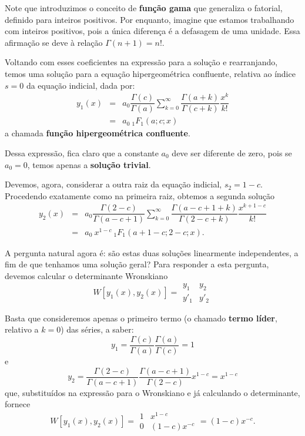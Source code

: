 {Note que introduzimos o conceito de \textbf{função gama} que generaliza o fatorial, definido para inteiros positivos. Por enquanto, imagine que estamos trabalhando com inteiros positivos, pois a única diferença é a defasagem de uma unidade. Essa afirmação se deve à relação $\Gamma(n + 1) = n!$.

Voltando com esses coeficientes na expressão para a solução e rearranjando, temos uma solução para a equação hipergeométrica confluente, relativa ao índice $s = 0$ da equação indicial, dada por:
$$\begin{array}{rcl}
y_1(x)
&=& a_{0} \dfrac{\Gamma(c)}{\Gamma(a)} \displaystyle\sum_{k=0}^{\infty} \dfrac{\Gamma(a+k)}{\Gamma(c+k)} \dfrac{x^{k}}{k!} \\
&=& a_{0}\ {}_1F_{1}(a; c; x)
\end{array}$$
a chamada \textbf{função hipergeométrica confluente}.

Dessa expressão, fica claro que a constante $a_{0}$ deve ser diferente de zero, pois se $a_{0} = 0$, temos apenas a \textbf{solução trivial}.

Devemos, agora, considerar a outra raiz da equação indicial, $s_{2} = 1 - c$. 
Procedendo exatamente como na primeira raiz, obtemos a segunda solução
$$\begin{array}{rcl}
y_2(x)
&=& a_{0} \dfrac{\Gamma(2-c)}{\Gamma(a-c+1)} \displaystyle\sum_{k=0}^{\infty} \dfrac{\Gamma(a-c+1+k)}{\Gamma(2-c+k)} \dfrac{x^{k+1-c}}{k!} \\
&=& a_{0}\ x^{1-c}\ {}_1F_{1}(a+1-c; 2-c; x).
\end{array}$$


A pergunta natural agora é: são estas duas soluções linearmente independentes, a fim de que tenhamos uma solução geral? Para responder a esta pergunta, devemos calcular o determinante Wronskiano
$$
W[y_1(x), y_2(x)] =
\begin{array}{|cc|}
y_1 & y_{2} \\ y'_{1} & y'_{2}
\end{array}$$

Basta que consideremos apenas o primeiro termo (o chamado \textbf{termo líder}, relativo a $k = 0$) das séries, a saber:
$$
y_{1} =
\dfrac{\Gamma(c)}{\Gamma(a)} \dfrac{\Gamma(a)}{\Gamma(c)} = 1
$$
e
$$
y_{2}
=
\dfrac{\Gamma(2-c)}{\Gamma(a-c+1)}
\dfrac{\Gamma(a-c+1)}{\Gamma(2-c)}
x^{1-c}
=
x^{1-c}
$$
que, substituídos na expressão para o Wronskiano e já calculando o determinante, fornece
$$
W[y_1(x), y_2(x)] =
\begin{array}{|cc|}
1 & x^{1-c} \\
0 & (1-c) x^{-c}
\end{array}
= (1-c) x^{-c}.
$$

}
